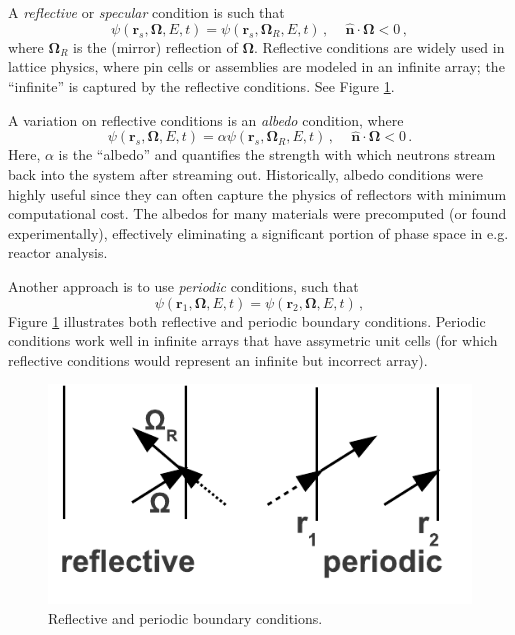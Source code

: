 A \textit{reflective} or \textit{specular} condition is such that 
\begin{equation}
 \psi(\mathbf{r}_s,\mathbf{\Omega},E,t) = \psi(\mathbf{r}_s,\mathbf{\Omega}_R,E,t) \, , \, \, \, \,  \, \, \, \mathbf{\hat{n}} \cdot \mathbf{\Omega} < 0 \, ,
\end{equation}
where $\mathbf{\Omega}_R$ is the (mirror) reflection of $\mathbf{\Omega}$.  Reflective conditions are widely used in lattice physics, where pin cells or assemblies are modeled in an infinite array; the ``infinite'' is captured by the reflective conditions.  See Figure \ref{fig:reflectiveperiodic}.

A variation on reflective conditions is an \textit{albedo} condition, where
\begin{equation}
 \psi(\mathbf{r}_s,\mathbf{\Omega},E,t) = \alpha \psi(\mathbf{r}_s,\mathbf{\Omega}_R,E,t) \, , \, \, \, \,  \, \, \, \mathbf{\hat{n}} \cdot \mathbf{\Omega} < 0 \, .
\end{equation}
Here, $\alpha$ is the ``albedo'' and quantifies the strength with which neutrons stream back into the system after streaming out.  Historically, albedo conditions were highly useful since they can often capture the physics of reflectors with minimum computational cost.  The albedos for many materials were precomputed (or found experimentally), effectively eliminating a significant portion of phase space in e.g. reactor analysis.

Another approach is to use \textit{periodic} conditions, such that
\begin{equation}
 \psi(\mathbf{r}_1,\mathbf{\Omega},E,t) = \psi(\mathbf{r}_2,\mathbf{\Omega},E,t) \, ,
\end{equation}
Figure \ref{fig:reflectiveperiodic} illustrates both reflective and periodic boundary conditions.  Periodic conditions work well in infinite arrays that have assymetric unit cells (for which reflective conditions would represent an infinite but incorrect array).

\begin{figure}[h] 
    \centering
    \includegraphics[keepaspectratio, width = 2.0 in]{images/reflectiveperiodic}
    \caption{Reflective and periodic boundary conditions.}
    \label{fig:reflectiveperiodic}
\end{figure}

